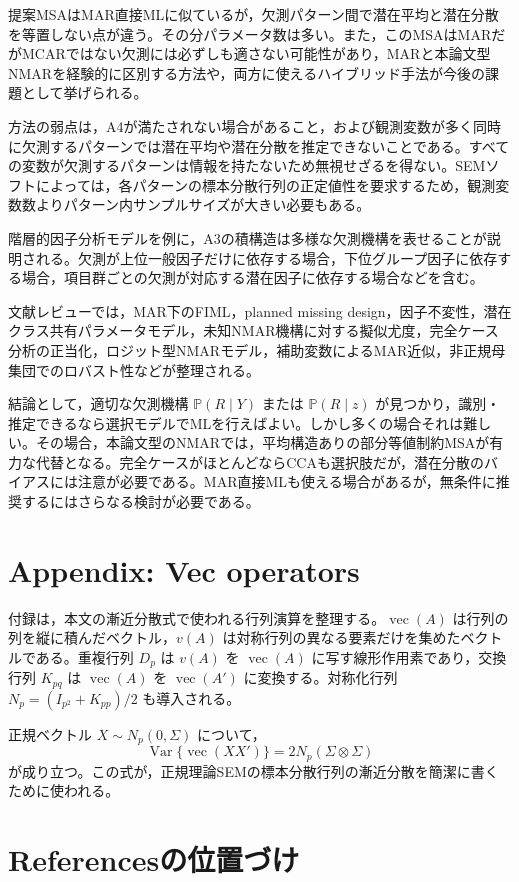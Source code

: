 \documentclass[dvipdfmx,autodetect-engine]{jsarticle}
\newcommand{\Prb}{\mathbb{P}}
\newcommand{\Var}{\operatorname{Var}}
\begin{document}
提案MSAはMAR直接MLに似ているが，欠測パターン間で潜在平均と潜在分散を等置しない点が違う。その分パラメータ数は多い。また，このMSAはMARだがMCARではない欠測には必ずしも適さない可能性があり，MARと本論文型NMARを経験的に区別する方法や，両方に使えるハイブリッド手法が今後の課題として挙げられる。

方法の弱点は，A4が満たされない場合があること，および観測変数が多く同時に欠測するパターンでは潜在平均や潜在分散を推定できないことである。すべての変数が欠測するパターンは情報を持たないため無視せざるを得ない。SEMソフトによっては，各パターンの標本分散行列の正定値性を要求するため，観測変数数よりパターン内サンプルサイズが大きい必要もある。

階層的因子分析モデルを例に，A3の積構造は多様な欠測機構を表せることが説明される。欠測が上位一般因子だけに依存する場合，下位グループ因子に依存する場合，項目群ごとの欠測が対応する潜在因子に依存する場合などを含む。

文献レビューでは，MAR下のFIML，planned missing design，因子不変性，潜在クラス共有パラメータモデル，未知NMAR機構に対する擬似尤度，完全ケース分析の正当化，ロジット型NMARモデル，補助変数によるMAR近似，非正規母集団でのロバスト性などが整理される。

結論として，適切な欠測機構 $\Prb(R\mid Y)$ または $\Prb(R\mid z)$ が見つかり，識別・推定できるなら選択モデルでMLを行えばよい。しかし多くの場合それは難しい。その場合，本論文型のNMARでは，平均構造ありの部分等値制約MSAが有力な代替となる。完全ケースがほとんどならCCAも選択肢だが，潜在分散のバイアスには注意が必要である。MAR直接MLも使える場合があるが，無条件に推奨するにはさらなる検討が必要である。

\section{Appendix: Vec operators}

付録は，本文の漸近分散式で使われる行列演算を整理する。$\operatorname{vec}(A)$ は行列の列を縦に積んだベクトル，$v(A)$ は対称行列の異なる要素だけを集めたベクトルである。重複行列 $D_p$ は $v(A)$ を $\operatorname{vec}(A)$ に写す線形作用素であり，交換行列 $K_{pq}$ は $\operatorname{vec}(A)$ を $\operatorname{vec}(A')$ に変換する。対称化行列 $N_p=(I_{p^2}+K_{pp})/2$ も導入される。

正規ベクトル $X\sim N_p(0,\Sigma)$ について，
\[
\Var\{\operatorname{vec}(XX')\}=2N_p(\Sigma\otimes\Sigma)
\]
が成り立つ。この式が，正規理論SEMの標本分散行列の漸近分散を簡潔に書くために使われる。

\section{Referencesの位置づけ}
\end{document}
